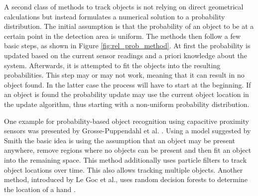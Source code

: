 A second class of methods to track objects is not relying on direct geometrical calculations but instead formulates a numerical solution to a probability distribution. The initial assumption is that the probability of an object to be at a certain point in the detection area is uniform. The methods then follow a few basic steps, as shown in Figure \ref{fig:rel_prob_method}. At first the probability is updated based on the current sensor readings and a priori knowledge about the system. Afterwards, it is attempted to fit the objects into the resulting probabilities. This step may or may not work, meaning that it can result in no object found. In the latter case the process will have to start at the beginning. If an object is found the probability update may use the current object location in the update algorithm, thus starting with a non-uniform probability distribution.

One example for probability-based object recognition using capacitive proximity sensors was presented by Grosse-Puppendahl et al. \cite{grosse2013swiss}. Using a model suggested by Smith the basic idea is using the assumption that an object may be present anywhere, remove regions where no objects can be present and then fit an object into the remaining space. This method additionally uses particle filters to track object locations over time. This also allows tracking multiple objects. Another method, introduced by Le Goc et al., uses random decision forests to determine the location of a hand \cite{le2014low}. 

